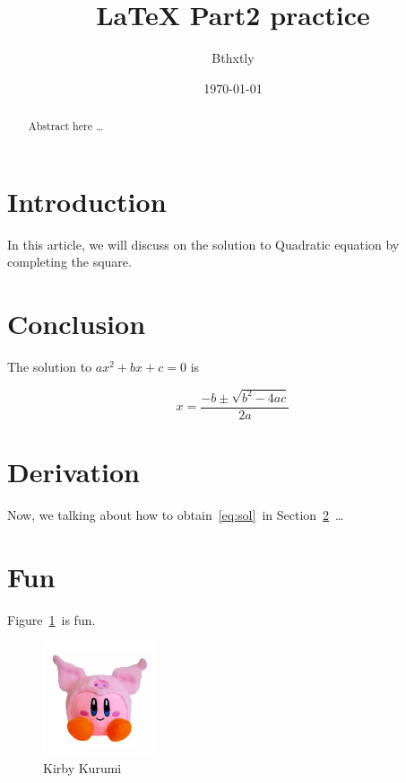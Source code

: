 \documentclass{article}
\title{\LaTeX{} Part2 practice}
\author{Bthxtly}
\date{\today}
\begin{document}
\maketitle

\begin{abstract}
Abstract here \ldots
\end{abstract}

\section{Introduction}
In this article, we will discuss on the solution to Quadratic equation 
by completing the square.

\section{Conclusion}
\label{sec:concl}

The solution to $ax^2 + bx + c = 0$ is

\begin{equation}
\label{eq:sol}
    x = \frac{-b \pm \sqrt{b^2 - 4ac}}{2a}
\end{equation}

\section{Derivation}
Now, we talking about how to obtain~\eqref{eq:sol}~in Section~\ref{sec:concl}~\ldots

\pagebreak


\section{Fun}
Figure~\ref{fig:kkm}~is fun.
\begin{figure}
\centering
\includegraphics[width=0.3\textwidth]{kirby_kurumi.jpeg}
\caption{\label{fig:kkm}Kirby Kurumi}
\end{figure}

\end{document}
